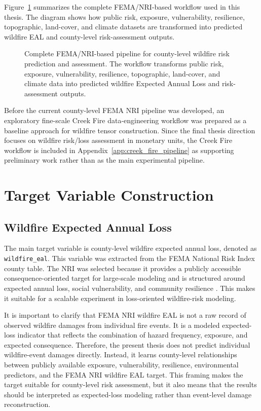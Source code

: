 Figure~\ref{fig:fema_nri_risk_pipeline} summarizes the complete FEMA/NRI-based workflow used in this thesis. The diagram shows how public risk, exposure, vulnerability, resilience, topographic, land-cover, and climate datasets are transformed into predicted wildfire EAL and county-level risk-assessment outputs.

\begin{figure}[htbp]
    \centering
    \caption{Complete FEMA/NRI-based pipeline for county-level wildfire risk prediction and assessment. The workflow transforms public risk, exposure, vulnerability, resilience, topographic, land-cover, and climate data into predicted wildfire Expected Annual Loss and risk-assessment outputs.}
    \label{fig:fema_nri_risk_pipeline}
\end{figure}

Before the current county-level FEMA NRI pipeline was developed, an exploratory fine-scale Creek Fire data-engineering workflow was prepared as a baseline approach for wildfire tensor construction. Since the final thesis direction focuses on wildfire risk/loss assessment in monetary units, the Creek Fire workflow is included in Appendix~\ref{app:creek_fire_pipeline} as supporting preliminary work rather than as the main experimental pipeline.

\section{Target Variable Construction}

\subsection{Wildfire Expected Annual Loss}

The main target variable is county-level wildfire expected annual loss, denoted as \texttt{wildfire\_eal}. This variable was extracted from the FEMA National Risk Index county table. The NRI was selected because it provides a publicly accessible consequence-oriented target for large-scale modeling and is structured around expected annual loss, social vulnerability, and community resilience \citep{fema2025nri_technical,fema2025nri_methodology}. This makes it suitable for a scalable experiment in loss-oriented wildfire-risk modeling.

It is important to clarify that FEMA NRI wildfire EAL is not a raw record of observed wildfire damages from individual fire events. It is a modeled expected-loss indicator that reflects the combination of hazard frequency, exposure, and expected consequence. Therefore, the present thesis does not predict individual wildfire-event damages directly. Instead, it learns county-level relationships between publicly available exposure, vulnerability, resilience, environmental predictors, and the FEMA NRI wildfire EAL target. This framing makes the target suitable for county-level risk assessment, but it also means that the results should be interpreted as expected-loss modeling rather than event-level damage reconstruction.

